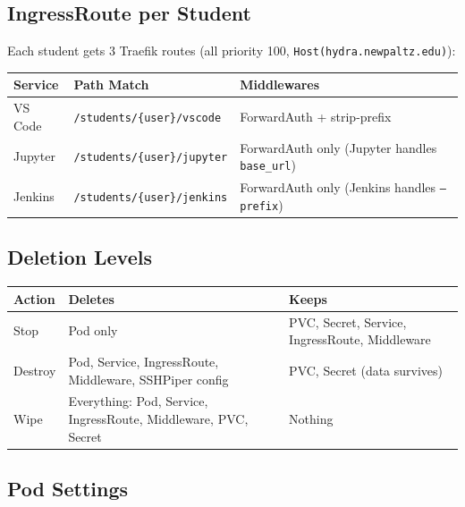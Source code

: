 \documentclass[11pt,a4paper]{article}
\begin{document}
\subsection{IngressRoute per Student}

Each student gets 3 Traefik routes (all priority 100, \texttt{Host(hydra.newpaltz.edu)}):

\begin{table}[H]
\centering
\begin{tabular}{llp{5.5cm}}
\toprule
\textbf{Service} & \textbf{Path Match} & \textbf{Middlewares} \\
\midrule
VS Code & \texttt{/students/\{user\}/vscode} & ForwardAuth + strip-prefix \\
Jupyter & \texttt{/students/\{user\}/jupyter} & ForwardAuth only (Jupyter handles \texttt{base\_url}) \\
Jenkins & \texttt{/students/\{user\}/jenkins} & ForwardAuth only (Jenkins handles \texttt{--prefix}) \\
\bottomrule
\end{tabular}
\end{table}

\subsection{Deletion Levels}

\begin{table}[H]
\centering
\begin{tabular}{lp{4.5cm}p{4.5cm}}
\toprule
\textbf{Action} & \textbf{Deletes} & \textbf{Keeps} \\
\midrule
Stop & Pod only & PVC, Secret, Service, IngressRoute, Middleware \\
Destroy & Pod, Service, IngressRoute, Middleware, SSHPiper config & PVC, Secret (data survives) \\
Wipe & Everything: Pod, Service, IngressRoute, Middleware, PVC, Secret & Nothing \\
\bottomrule
\end{tabular}
\end{table}

\subsection{Pod Settings}
\end{document}
